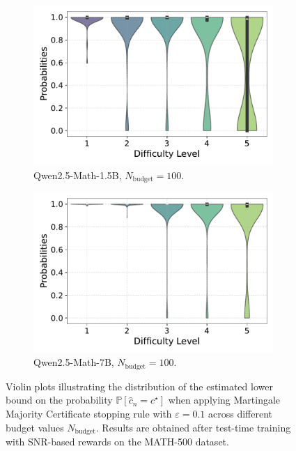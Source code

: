 \begin{figure}[h!]
\begin{subfigure}{0.49\textwidth}
      \includegraphics[width=\textwidth]{figs/QWEN-MATH-1.5B_violin_maj100_probability_adaptive_01_NO_ground_truth.pdf}
        \caption{Qwen2.5-Math-1.5B, $N_{\text{budget}}=100$.}
      \label{fig:QWEN-MATH-1.5B_budget_100_NO_01}
  \end{subfigure}
  \hfill
  \begin{subfigure}{0.49\textwidth}
      \centering
      \includegraphics[width=\textwidth]{figs/QWEN-MATH-7B_violin_maj100_probability_adaptive_01_NO_ground_truth.pdf}
        \caption{Qwen2.5-Math-7B, $N_{\text{budget}}=100$.}
      \label{fig:QWEN-MATH-7B_budget_100_NO_01}
  \end{subfigure}
  \caption{Violin plots illustrating the distribution of the estimated lower bound on the probability $\mathbb{P}[\widehat{c}_n = c^\star]$ when applying Martingale Majority Certificate stopping rule with $\varepsilon = 0.1$ across different budget values $N_{\text{budget}}$. 
  Results are obtained after test-time training with SNR-based rewards on the MATH-500 dataset.}
  \label{fig:violin_plots_NO_ground_truth_01}
\end{figure}

